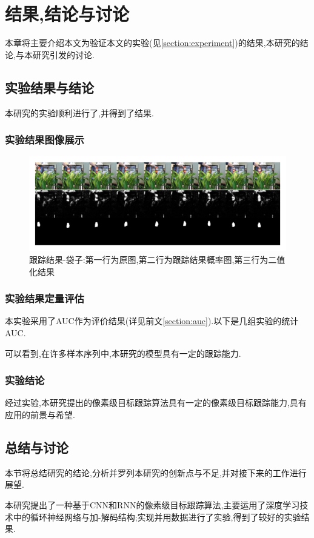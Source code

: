 
\chapter{结果,结论与讨论}
本章将主要介绍本文为验证本文的实验(见\ref{section:experiment})的结果,本研究的结论,与本研究引发的讨论.
\section{实验结果与结论}
本研究的实验顺利进行了,并得到了结果.
\subsection{实验结果图像展示}
\par
\begin{figure}
    \centering
    \includegraphics[width = 1.\textwidth]{chap/img/result_bag.pdf}
    \caption{跟踪结果-袋子:第一行为原图,第二行为跟踪结果概率图,第三行为二值化结果}
    \label{fig:result_bag}
\end{figure}
\par
\subsection{实验结果定量评估}
本实验采用了AUC作为评价结果(详见前文\ref{section:auc}).以下是几组实验的统计AUC.
\par
可以看到,在许多样本序列中,本研究的模型具有一定的跟踪能力.
\subsection{实验结论}
经过实验,本研究提出的像素级目标跟踪算法具有一定的像素级目标跟踪能力,具有应用的前景与希望.

\section{总结与讨论}
本节将总结研究的结论,分析并罗列本研究的创新点与不足,并对接下来的工作进行展望.
\par
本研究提出了一种基于CNN和RNN的像素级目标跟踪算法,主要运用了深度学习技术中的循环神经网络与加-解码结构;实现并用数据进行了实验,得到了较好的实验结果.
